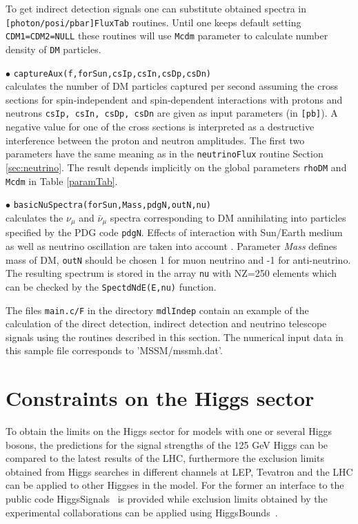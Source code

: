 \documentclass[12pt,a4paper]{article}
\begin{document}
To get indirect detection signals one can substitute obtained spectra in\\ 
{\tt [photon/posi/pbar]FluxTab} routines. Until one keeps default setting  {\tt CDM1=CDM2=NULL} these routines will use {\tt Mcdm} parameter to calculate number density of {\tt DM} particles. 
  

\noindent $\bullet$ \verb|captureAux(f,forSun,csIp,csIn,csDp,csDn)|\\
calculates the number of DM particles captured per second assuming the cross sections
for  spin-independent and spin-dependent 
interactions with protons and neutrons   {\tt csIp, csIn, csDp, csDn} are
given as input parameters (in {\tt [pb]}). 
A negative value for one of the cross sections  is interpreted as a destructive
interference between the  proton and neutron amplitudes. The first two
parameters have the same meaning as in the {\tt neutrinoFlux} routine Section \ref{sec:neutrino}. The
result  depends implicitly on the global parameters {\tt rhoDM} and {\tt
Mcdm} in Table \ref{paramTab}. 


\noindent
$\bullet$ \verb|basicNuSpectra(forSun,Mass,pdgN,outN,nu)|\\
calculates the $\nu_{\mu}$ and $\bar{\nu}_{\mu}$  spectra corresponding to  DM annihilating into particles specified by the PDG code {\tt pdgN}. Effects of interaction with Sun/Earth medium as well as neutrino oscillation  are taken into account \cite{Cirelli:2005gh}.
Parameter {\it Mass} defines mass of DM,
{\tt outN} should be chosen 1 for muon neutrino and -1 for anti-neutrino. The resulting spectrum is stored in the array 
  \verb|nu| with NZ=250 elements  which can be checked by the {\tt SpectdNdE(E,nu)}
function.


The files {\verb|main.c/F|} in the directory {\tt mdlIndep}  contain an example of the calculation of the direct detection,  indirect detection 
and neutrino telescope signals using the routines described in this section. 
The numerical input data in this sample file corresponds to 'MSSM/mssmh.dat'. 

\section{Constraints on the Higgs sector}

To obtain the  limits on the Higgs sector for models with one or several Higgs bosons, the predictions for the signal strengths of the 125 GeV Higgs  can be
compared  to the latest results of the LHC, furthermore the exclusion limits obtained from Higgs searches in different channels at LEP, Tevatron and the LHC can be applied to other Higgses in the model. For the former  an interface to the public code HiggsSignals~\cite{Bechtle:2013xfa} is provided while  exclusion limits obtained by the experimental collaborations can be applied using 
HiggsBounds~\cite{Bechtle:2013wla}. 
\end{document}
